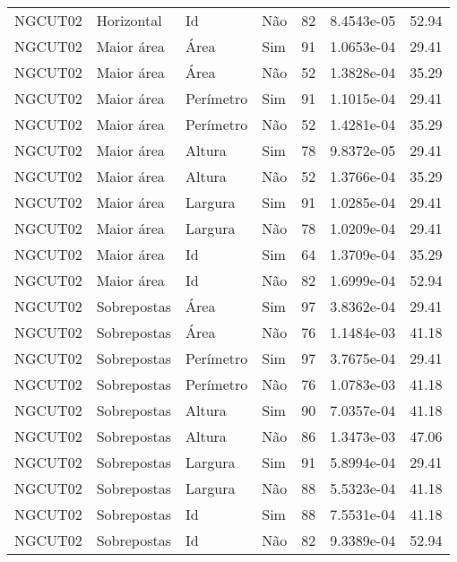 \begin{tabular}{llllrrr}
NGCUT02   & Horizontal  & Id        & Não         & 82           & 8.4543e-05 & 52.94    \\
NGCUT02   & Maior área  & Área      & Sim         & 91           & 1.0653e-04 & 29.41    \\
NGCUT02   & Maior área  & Área      & Não         & 52           & 1.3828e-04 & 35.29    \\
NGCUT02   & Maior área  & Perímetro & Sim         & 91           & 1.1015e-04 & 29.41    \\
NGCUT02   & Maior área  & Perímetro & Não         & 52           & 1.4281e-04 & 35.29    \\
NGCUT02   & Maior área  & Altura    & Sim         & 78           & 9.8372e-05 & 29.41    \\
NGCUT02   & Maior área  & Altura    & Não         & 52           & 1.3766e-04 & 35.29    \\
NGCUT02   & Maior área  & Largura   & Sim         & 91           & 1.0285e-04 & 29.41    \\
NGCUT02   & Maior área  & Largura   & Não         & 78           & 1.0209e-04 & 29.41    \\
NGCUT02   & Maior área  & Id        & Sim         & 64           & 1.3709e-04 & 35.29    \\
NGCUT02   & Maior área  & Id        & Não         & 82           & 1.6999e-04 & 52.94    \\
NGCUT02   & Sobrepostas & Área      & Sim         & 97           & 3.8362e-04 & 29.41    \\
NGCUT02   & Sobrepostas & Área      & Não         & 76           & 1.1484e-03 & 41.18    \\
NGCUT02   & Sobrepostas & Perímetro & Sim         & 97           & 3.7675e-04 & 29.41    \\
NGCUT02   & Sobrepostas & Perímetro & Não         & 76           & 1.0783e-03 & 41.18    \\
NGCUT02   & Sobrepostas & Altura    & Sim         & 90           & 7.0357e-04 & 41.18    \\
NGCUT02   & Sobrepostas & Altura    & Não         & 86           & 1.3473e-03 & 47.06    \\
NGCUT02   & Sobrepostas & Largura   & Sim         & 91           & 5.8994e-04 & 29.41    \\
NGCUT02   & Sobrepostas & Largura   & Não         & 88           & 5.5323e-04 & 41.18    \\
NGCUT02   & Sobrepostas & Id        & Sim         & 88           & 7.5531e-04 & 41.18    \\
NGCUT02   & Sobrepostas & Id        & Não         & 82           & 9.3389e-04 & 52.94    \\
\hline
\end{tabular}